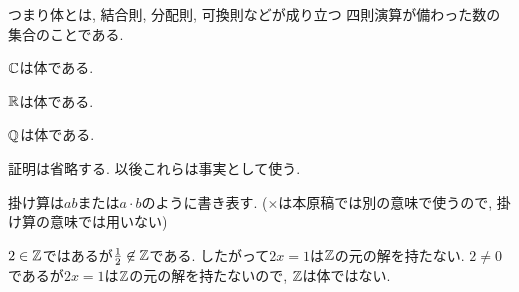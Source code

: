 \begin{remark}
  つまり体とは,
  結合則, 分配則, 可換則などが成り立つ
  四則演算が備わった数の集合のことである.
\end{remark}


\begin{example}
  $\mathbb{C}$は体である.
\end{example}
\begin{example}
  $\mathbb{R}$は体である.
\end{example}
\begin{example}
  $\mathbb{Q}$は体である.
\end{example}
\begin{remark}
  証明は省略する.
  以後これらは事実として使う.
\end{remark}
\begin{remark}
  掛け算は$ab$または$a\cdot b$のように書き表す.
  ($\times$は本原稿では別の意味で使うので,
  掛け算の意味では用いない)
\end{remark}


\begin{example}
  $2\in\mathbb{Z}$ではあるが$\frac{1}{2}\not\in \mathbb{Z}$である.
  したがって$2x=1$は$\mathbb{Z}$の元の解を持たない.
  $2\neq 0$であるが$2x=1$は$\mathbb{Z}$の元の解を持たないので,
  $\mathbb{Z}$は体ではない.
\end{example}




